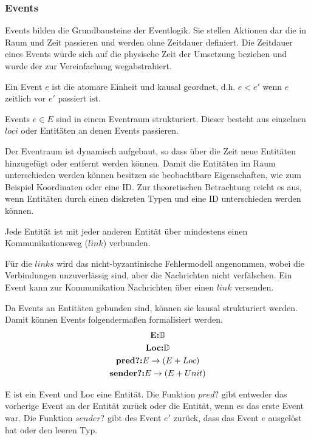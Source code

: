 \subsubsection{Events}
Events bilden die Grundbausteine der Eventlogik.
Sie stellen Aktionen dar die in Raum und Zeit passieren und
werden ohne Zeitdauer definiert.
Die Zeitdauer eines Events würde sich auf die physische Zeit der
Umsetzung beziehen und wurde der zur Vereinfachung
wegabstrahiert.~\cite{bickford2005causal}

\begin{defi}
  Ein Event $e$ ist die atomare Einheit und kausal geordnet, d.h.
  $e< e'$ wenn $e$ zeitlich vor $e'$ passiert ist.
\end{defi}

\begin{defi}
  Events $e\in E$ sind in einem Eventraum strukturiert. Dieser besteht
  aus einzelnen $loci$ oder Entitäten an denen Events passieren.
\end{defi}

Der Eventraum ist dynamisch aufgebaut, so dass über die Zeit neue Entitäten
hinzugefügt oder entfernt werden können. Damit die Entitäten im Raum
unterschieden werden können besitzen sie beobachtbare Eigenschaften, wie zum
Beispiel Koordinaten oder eine ID. Zur theoretischen Betrachtung reicht es aus,
wenn Entitäten durch einen diskreten Typen und eine ID unterschieden werden können.~\cite{bickford2005causal}

\begin{defi}
  Jede Entität ist mit jeder anderen Entität über mindestens
  einen Kommunikationsweg ($link$) verbunden.
\end{defi}

Für die $links$ wird das nicht-byzantinische Fehlermodell angenommen,
wobei die Verbindungen unzuverlässig sind, aber die Nachrichten nicht
verfälschen. Ein Event kann zur Kommunikation Nachrichten über einen
$link$ versenden.

Da Events an Entitäten gebunden sind, können sie kausal strukturiert werden.
Damit können Events folgendermaßen formalisiert werden.
\begin{gather*}
  \textbf{E:}\mathbb{D}\notag\\
  \textbf{Loc:}\mathbb{D}\\
  \textbf{pred?:} E\rightarrow (E+Loc)\\
  \textbf{sender?:} E\rightarrow (E+Unit)
\end{gather*}

E ist ein Event und Loc eine Entität. Die Funktion $pred?$ gibt entweder das
vorherige Event an der Entität zurück oder die Entität, wenn es das erste Event
war. Die Funktion $sender?$ gibt des Event $e'$ zurück, dass das Event $e$
ausgelöst hat oder den leeren Typ.~\cite{bickford2005causal}

